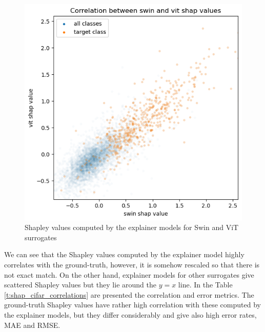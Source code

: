 \documentclass[magisterska,en]{pracamgr}
\begin{document}
\begin{figure}[H]
\centering
\includegraphics[scale=0.5]{./images/swin_vit_cifar.png}
\caption{Shapley values computed by the explainer models for Swin and ViT surrogates}
\label{swin_vit_cifar}
\end{figure}

We can see that the Shapley values computed by the explainer model highly correlates with the ground-truth, however, it is somehow rescaled so that there is not exact match. On the other hand, explainer models for other surrogates give scattered Shapley values but they lie around the $y=x$ line. In the Table \ref{t:shap_cifar_correlations} are presented the correlation and error metrics. The ground-truth Shapley values have rather high correlation with these computed by the explainer models, but they differ considerably and give also high error rates, MAE and RMSE.
\end{document}
